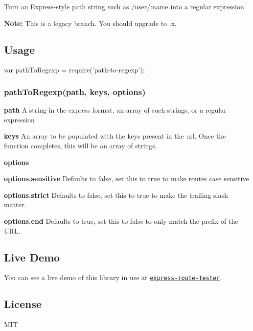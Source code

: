 Turn an Express-\/style path string such as {\ttfamily /user/\+:name} into a regular expression.

{\bfseries Note\+:} This is a legacy branch. You should upgrade to {.\+x}.

\subsection*{Usage}


\begin{DoxyCode}
var pathToRegexp = require('path-to-regexp');
\end{DoxyCode}


\subsubsection*{path\+To\+Regexp(path, keys, options)}


\begin{DoxyItemize}
\item {\bfseries path} A string in the express format, an array of such strings, or a regular expression
\item {\bfseries keys} An array to be populated with the keys present in the url. Once the function completes, this will be an array of strings.
\item {\bfseries options}
\begin{DoxyItemize}
\item {\bfseries options.\+sensitive} Defaults to false, set this to true to make routes case sensitive
\item {\bfseries options.\+strict} Defaults to false, set this to true to make the trailing slash matter.
\item {\bfseries options.\+end} Defaults to true, set this to false to only match the prefix of the U\+RL.
\end{DoxyItemize}
\end{DoxyItemize}




\subsection*{Live Demo}

You can see a live demo of this library in use at \href{http://forbeslindesay.github.com/express-route-tester/}{\tt express-\/route-\/tester}.

\subsection*{License}

M\+IT 
